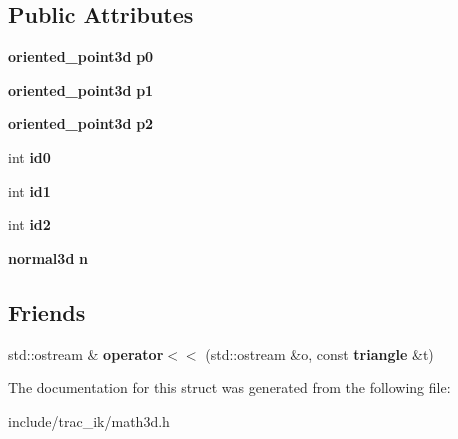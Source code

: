 \subsection*{Public Attributes}
\begin{DoxyCompactItemize}
\item 
{\bf oriented\-\_\-point3d} {\bfseries p0}\label{structmath3d_1_1triangle_ac28fa405b122973e492add98a512d13a}

\item 
{\bf oriented\-\_\-point3d} {\bfseries p1}\label{structmath3d_1_1triangle_a0ea69e8e6c83002db432b1c7ad2cdff1}

\item 
{\bf oriented\-\_\-point3d} {\bfseries p2}\label{structmath3d_1_1triangle_aaa2244afbb836c5bd624049f8e541776}

\item 
int {\bfseries id0}\label{structmath3d_1_1triangle_ac8004ed1ded5950c4eef8261d6915e22}

\item 
int {\bfseries id1}\label{structmath3d_1_1triangle_ad3505d4dddc0942841f430b88c039dfd}

\item 
int {\bfseries id2}\label{structmath3d_1_1triangle_abc04a393acb00fb0a7116397533521df}

\item 
{\bf normal3d} {\bfseries n}\label{structmath3d_1_1triangle_a8db3846876bcbf4d19ee9637a19288e5}

\end{DoxyCompactItemize}
\subsection*{Friends}
\begin{DoxyCompactItemize}
\item 
std\-::ostream \& {\bfseries operator$<$$<$} (std\-::ostream \&o, const {\bf triangle} \&t)\label{structmath3d_1_1triangle_a7086a8d2df1a322dd8213e5c59de805a}

\end{DoxyCompactItemize}


The documentation for this struct was generated from the following file\-:\begin{DoxyCompactItemize}
\item 
include/trac\-\_\-ik/math3d.\-h\end{DoxyCompactItemize}
